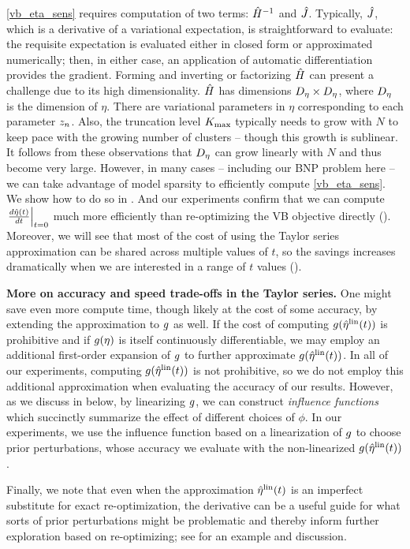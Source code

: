 \eqref{vb_eta_sens} requires computation of two terms: $\hat{H}^{-1}$ and
$\hat J$.  Typically, $\hat J$, which is a derivative of a
variational expectation, is straightforward to evaluate: the requisite
expectation is evaluated either in closed form or approximated numerically;
then, in either case, an application of automatic differentiation provides the
gradient. Forming and inverting or factorizing $\hat{H}$ can present a
challenge due to its high dimensionality. $\hat{H}$ has dimensions ${D_{\eta}}
\times {D_{\eta}}$, where ${D_{\eta}}$ is the dimension of $\eta$. There are
variational parameters in $\eta$ corresponding to each parameter $z_n$. Also,
the truncation level ${K_{\mathrm{max}}}$ typically needs to grow with $N$ to keep pace with
the growing number of clusters -- though this growth is sublinear. It follows
from these observations that ${D_{\eta}}$ can grow linearly with $N$ and thus
become very large.  However, in many cases -- including our BNP problem here --
we can take advantage of model sparsity to efficiently compute
\eqref{vb_eta_sens}. We show how to do so in . And
our experiments confirm that we can compute $\left.\frac{d \hat\eta(t)}{d t}\right\vert_{t=0}$
much more efficiently than re-optimizing the VB objective directly
(). Moreover, we will see that most of the cost of using
the Taylor series approximation can be shared across multiple values of $t$, so
the savings increases dramatically when we are interested in a range of $t$
values ().

\noindent \textbf{More on accuracy and speed trade-offs in the Taylor series.}
One might save even more compute time, though likely at the cost of some
accuracy, by extending the approximation to $g$ as well. If the cost of
computing $g(\hat\eta^{\mathrm{lin}}(t))$ is prohibitive and if $g(\eta)$ is itself
continuously differentiable, we may employ an additional first-order expansion
of $g$ to further approximate $g(\hat\eta^{\mathrm{lin}}(t))$. In all of our experiments,
computing $g(\hat\eta^{\mathrm{lin}}(t))$ is not prohibitive, so we do not employ this
additional approximation when evaluating the accuracy of our results. However,
as we discuss in  below, by linearizing $g$, we can
construct {\em influence functions} which succinctly summarize the effect of
different choices of $\phi$.  In our experiments, we use the influence function
based on a linearization of $g$ to choose prior perturbations, whose accuracy
we evaluate with the non-linearized $g(\hat\eta^{\mathrm{lin}}(t))$.

Finally, we note that even when the approximation $\hat\eta^{\mathrm{lin}}(t)$ is an imperfect
substitute for exact re-optimization, the derivative can be a useful guide for
what sorts of prior perturbations might be problematic and thereby inform
further exploration based on re-optimizing; see  for
an example and discussion.

